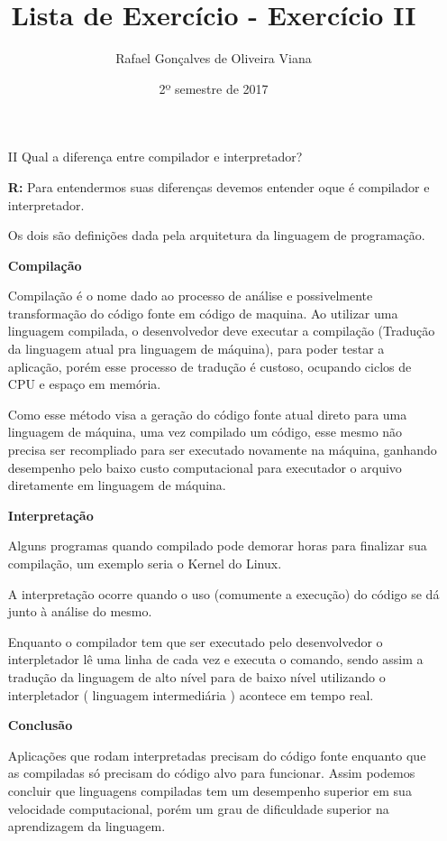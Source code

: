 \documentclass[12pt]{article}
\title{Lista de Exercício  - Exercício II }
\author{Rafael Gonçalves de  Oliveira Viana}
\date{2º semestre de 2017}
\begin{document}
\maketitle

\begin{enumerate}
\item[II]
Qual a diferença entre compilador e interpretador?

\textbf{R:}	
Para entendermos suas diferenças devemos entender oque é compilador e interpretador.
 
Os dois são definições dada pela arquitetura da linguagem de programação.

\textbf{Compilação}

Compilação é o nome dado ao processo de análise e possivelmente transformação do código fonte em código de maquina. Ao utilizar uma linguagem compilada, o desenvolvedor deve executar a compilação (Tradução da linguagem atual pra linguagem de máquina), para poder testar a aplicação, porém esse processo de tradução é custoso, ocupando ciclos de CPU e espaço em memória.

Como esse método visa a geração do código fonte atual direto para uma linguagem de máquina, uma vez compilado um código, esse mesmo não precisa ser recompliado para ser executado novamente na máquina, ganhando desempenho pelo baixo custo computacional para executador o arquivo diretamente em linguagem de máquina.

\textbf{Interpretação}

Alguns programas quando compilado pode demorar horas para finalizar sua compilação, um exemplo seria o Kernel do Linux. 

A interpretação ocorre quando o uso (comumente a execução) do código se dá junto à análise do mesmo.

Enquanto o compilador tem que ser executado pelo desenvolvedor o interpletador lê uma linha de cada vez e executa o comando, sendo assim a tradução da linguagem de alto nível para de baixo nível utilizando o interpletador ( linguagem intermediária ) acontece em tempo real.

\textbf{Conclusão}

 Aplicações que rodam interpretadas precisam do código fonte enquanto que as compiladas só precisam do código alvo para funcionar. Assim podemos concluir que linguagens compiladas tem um desempenho superior em sua velocidade computacional, porém um grau de dificuldade superior na aprendizagem da linguagem.

 
 
\end{enumerate}
\end{document}

